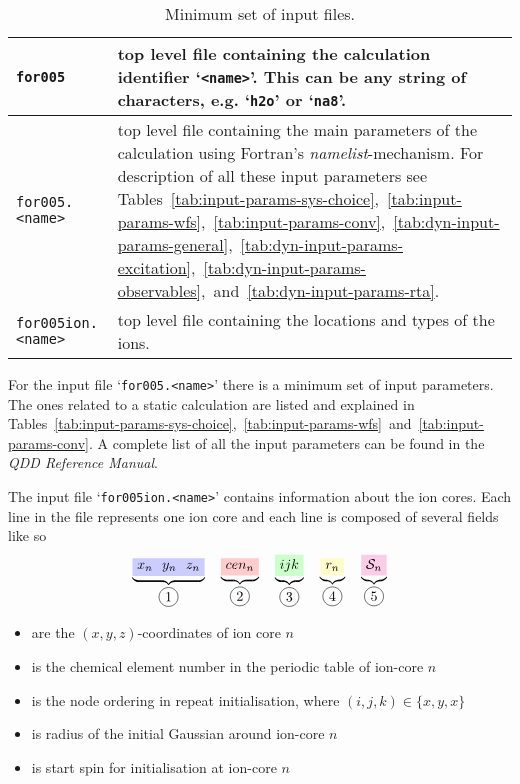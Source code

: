 \documentclass[11pt,a4paper]{article}
\begin{document}
		\begin{table}[h]
			\caption{Minimum set of input files.}\label{tab:input-files}
			\begin{tabular}{|p{3.5cm}|p{11.2cm}|}
				\hline
				\texttt{for005} & top level file containing the calculation identifier `\texttt{<name>}'. This can be any string of characters, e.g. `\texttt{h2o}' or `\texttt{na8}'. \\
			  	\hline
			  	\texttt{for005.<name>} & top level file containing the main parameters of the calculation using Fortran's \textit{namelist}-mechanism. For description of all these input parameters see Tables~\ref{tab:input-params-sys-choice},~\ref{tab:input-params-wfs},~\ref{tab:input-params-conv},~\ref{tab:dyn-input-params-general},~\ref{tab:dyn-input-params-excitation},~\ref{tab:dyn-input-params-observables},~and~\ref{tab:dyn-input-params-rta}.\\
			  	\hline
			  	\texttt{for005ion.<name>} & top level file containing the locations and types of the ions.\\
			 	\hline
			\end{tabular}
		\end{table}
		
		For the input file `\texttt{for005.<name>}' there is a minimum set of input parameters. The ones related to a static calculation are listed and explained in Tables~\ref{tab:input-params-sys-choice},~\ref{tab:input-params-wfs}~and~\ref{tab:input-params-conv}. A complete list of all the input parameters can be found in the \textit{QDD Reference Manual}.
		
		The input file `\texttt{for005ion.<name>}' contains information about the ion cores. Each line in the file represents one ion core and each line is composed of several fields like so
		\begin{align*}
			\underbrace{\tikz[baseline]{\node[fill=blue!20,anchor=base]{$x_n\:\:\: y_n\:\:\: z_n$};}}_{\circled{1}}\quad
			\underbrace{\tikz[baseline]{\node[fill=red!20,anchor=base]{$cen_n$};}}_{\circled{2}}\quad
			\underbrace{\tikz[baseline]{\node[fill=green!20,anchor=base]{$ijk$};}}_{\circled{3}}\quad
			\underbrace{\tikz[baseline]{\node[fill=yellow!20,anchor=base]{$r_n$};}}_{\circled{4}}\quad
			\underbrace{\tikz[baseline]{\node[fill=magenta!20,anchor=base]{$\mathcal{S}_n$};}}_{\circled{5}}
		\end{align*}
		\begin{itemize}
			\item[\circled{1}] are the $(x,y,z)$-coordinates of ion core $n$
			\item[\circled{2}] is the chemical element number in the periodic table of ion-core $n$
			\item[\circled{3}] is the node ordering in repeat initialisation, where $(i,j,k)\in\{x,y,x\}$
			\item[\circled{4}] is radius of the initial Gaussian around ion-core $n$
			\item[\circled{5}] is start spin for initialisation at ion-core $n$
		\end{itemize}\newpage
\end{document}
